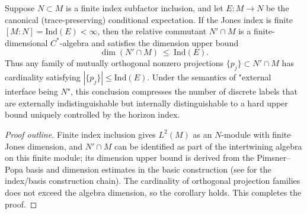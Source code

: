 \begin{proposition}\label{prop:dephys-relative-commutant-dimension-index-cap}
Suppose \(N\subset M\) is a finite index subfactor inclusion, and let \(E:M\to N\) be the canonical (trace-preserving) conditional expectation.
If the Jones index is finite \([M:N]=\mathrm{Ind}(E)<\infty\), then the relative commutant \(N'\cap M\) is a finite-dimensional \(C^\ast\)-algebra and satisfies the dimension upper bound
\begin{equation}\label{eq:dephys-relative-commutant-dimension-bound}
\boxed{\;\dim(N'\cap M)\ \le\ \mathrm{Ind}(E).\;}
\end{equation}
Thus any family of mutually orthogonal nonzero projections \(\{p_j\}\subset N'\cap M\) has cardinality satisfying
\(
|\{p_j\}|\le \mathrm{Ind}(E)
\).
Under the semantics of "external interface being \(N\)", this conclusion compresses the number of discrete labels that are externally indistinguishable but internally distinguishable to a hard upper bound uniquely controlled by the horizon index.
\end{proposition}

\begin{proof}[Proof outline]
Finite index inclusion gives \(L^2(M)\) as an \(N\)-module with finite Jones dimension, and \(N'\cap M\) can be identified as part of the intertwining algebra on this finite module;
its dimension upper bound is derived from the Pimsner--Popa basis and dimension estimates in the basic construction (see \cite{PimsnerPopa1986EntropyIndexSubfactors} for the index/basis construction chain).
The cardinality of orthogonal projection families does not exceed the algebra dimension, so the corollary holds. This completes the proof.
\end{proof}



